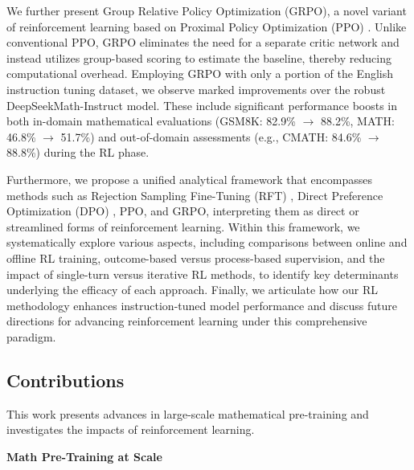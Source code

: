 We further present Group Relative Policy Optimization (GRPO), a novel variant of reinforcement learning based on Proximal Policy Optimization (PPO) \citep{schulman2017proximal}. Unlike conventional PPO, GRPO eliminates the need for a separate critic network and instead utilizes group-based scoring to estimate the baseline, thereby reducing computational overhead. Employing GRPO with only a portion of the English instruction tuning dataset, we observe marked improvements over the robust DeepSeekMath-Instruct model. These include significant performance boosts in both in-domain mathematical evaluations (GSM8K: 82.9\% $\rightarrow$ 88.2\%, MATH: 46.8\% $\rightarrow$ 51.7\%) and out-of-domain assessments (e.g., CMATH: 84.6\% $\rightarrow$ 88.8\%) during the RL phase. 

Furthermore, we propose a unified analytical framework that encompasses methods such as Rejection Sampling Fine-Tuning (RFT) \citep{yuan2023scaling}, Direct Preference Optimization (DPO) \citep{dpo}, PPO, and GRPO, interpreting them as direct or streamlined forms of reinforcement learning. Within this framework, we systematically explore various aspects, including comparisons between online and offline RL training, outcome-based versus process-based supervision, and the impact of single-turn versus iterative RL methods, to identify key determinants underlying the efficacy of each approach. Finally, we articulate how our RL methodology enhances instruction-tuned model performance and discuss future directions for advancing reinforcement learning under this comprehensive paradigm.

\subsection{Contributions}
This work presents advances in large-scale mathematical pre-training and investigates the impacts of reinforcement learning.

\textbf{Math Pre-Training at Scale}

